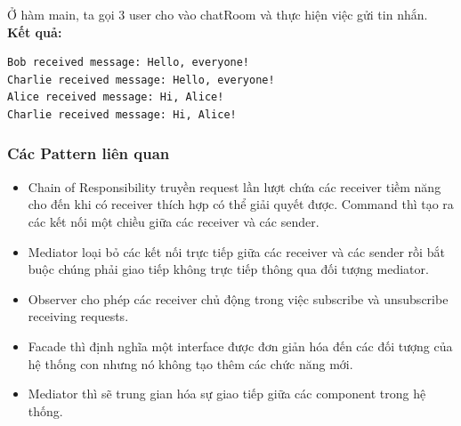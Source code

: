 Ở hàm main, ta gọi 3 user cho vào chatRoom và thực hiện việc gửi tin nhắn.\\
\newline
\textbf{Kết quả:}
\begin{lstlisting}
Bob received message: Hello, everyone!
Charlie received message: Hello, everyone!
Alice received message: Hi, Alice!
Charlie received message: Hi, Alice!
\end{lstlisting}
\subsubsection{Các Pattern liên quan}
\begin{itemize}
    \item Chain of Responsibility truyền request lần lượt chứa các receiver tiềm năng cho đến khi có receiver thích hợp có thể giải quyết được. Command thì tạo ra các kết nối một chiều giữa các receiver và các sender.
    \item Mediator loại bỏ các kết nối trực tiếp giữa các receiver và các sender rồi bắt buộc chúng phải giao tiếp không trực tiếp thông qua đối tượng mediator.
    \item Observer cho phép các receiver chủ động trong việc subscribe và unsubscribe receiving requests.
    \item Facade thì định nghĩa một interface được đơn giản hóa đến các đối tượng của hệ thống con nhưng nó không tạo thêm các chức năng mới.
    \item Mediator thì sẽ trung gian hóa sự giao tiếp giữa các component trong hệ thống.
\end{itemize}